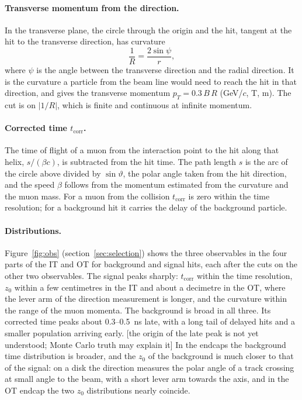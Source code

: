 \IfFileExists{jinst.cls}{\documentclass[a4paper,11pt]{jinst}}
\newcommand{\pT}{p_T}
\newcommand{\tc}{t_\mathrm{corr}}
\newcommand{\todo}[1]{\textcolor{red!70!black}{[#1]}}
\begin{document}
\paragraph{Transverse momentum from the direction.} In the transverse plane, the circle through the
origin and the hit, tangent at the hit to the transverse direction, has curvature
\begin{equation}
  \frac1R = \frac{2\sin\psi}{r},
\end{equation}
where $\psi$ is the angle between the transverse direction and the radial direction. It is the
curvature a particle from the beam line would need to reach the hit in that direction, and gives
the transverse momentum $\pT=0.3\,B\,R$ (GeV/$c$, T, m). The cut is on $|1/R|$, which is finite and
continuous at infinite momentum.

\paragraph{Corrected time $\tc$.} The time of flight of a muon from the interaction point to the hit
along that helix, $s/(\beta c)$, is subtracted from the hit time. The path length $s$ is the arc of
the circle above divided by $\sin\vartheta$, the polar angle taken from the hit direction, and the
speed $\beta$ follows from the momentum estimated from the curvature and the muon mass. For a muon
from the collision $\tc$ is zero within the time resolution; for a background hit it carries the
delay of the background particle.

\paragraph{Distributions.} Figure~\ref{fig:obs} (section~\ref{sec:selection}) shows the three
observables in the four parts of the IT and OT for background and signal hits, each after the cuts on
the other two observables. The signal peaks
sharply: $\tc$ within the time resolution, $z_0$ within a few centimetres in the IT and about a
decimetre in the OT, where the lever arm of the direction measurement is longer, and the curvature
within the range of the muon momenta. The background is broad in all three. Its corrected time
peaks about 0.3--0.5~ns late, with a long tail of delayed hits and a smaller population arriving
early. \todo{the origin of the late peak is not yet understood; Monte Carlo truth may explain it}
In the endcaps the background time distribution is broader, and the $z_0$ of the background is
much closer to that of the signal: on a disk the direction measures the polar angle of a track
crossing at small angle to the beam, with a short lever arm towards the axis, and in the OT endcap
the two $z_0$ distributions nearly coincide.
\end{document}
